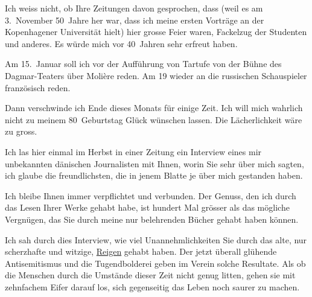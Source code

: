\pstart
           Ich weiss nicht, ob Ihre Zeitungen davon gesprochen, dass (weil es am
                  3. November 50 Jahre her war, dass ich meine ersten Vorträge an der
                  Kopenhagener Universität hielt) hier grosse
               Feier waren, Fackelzug der Studenten {\pb}und anderes. Es würde mich vor
               40 Jahren sehr erfreut haben.\pend
           
\pstart
           Am 15. Januar soll ich vor der Aufführung von Tartufe von der Bühne des Dagmar-Teaters über Molière reden. Am
                  19 wieder an die russischen
               Schauspieler französisch reden.\pend
           
\pstart
           Dann verschwinde ich Ende dieses Monats für einige Zeit. Ich will mich wahrlich nicht
               zu meinem 80 Geburtstag Glück wünschen lassen. Die Lächerlichkeit wäre zu gross.\pend
           
\pstart
           Ich las hier einmal im Herbst in einer Zeitung ein Interview eines mir unbekannten { }dänischen Journalisten mit
               Ihnen, worin Sie sehr \label{K_L02373-2v}\label{K_L02373-2} über
               mich sagten, ich glaube die freundlichsten, die in jenem Blatte je über mich
               gestanden haben.\pend
           
\pstart
           Ich bleibe Ihnen immer verpflichtet und {\pb}verbunden. Der Genuss, den ich
               durch das Lesen Ihrer Werke gehabt habe, ist hundert Mal grösser als das mögliche
               Vergnügen, das Sie durch meine nur belehrenden Bücher gehabt haben können.\pend
           
\pstart
           Ich sah durch dies Interview,
               wie viel Unannehmlichkeiten Sie durch das alte, nur scherzhafte und witzige, \uline{Reigen} gehabt haben. Der jetzt überall glühende Antisemitismus und die Tugendbolderei
                  \introOben{}geben\introOben{} im Verein 
               solche Resultate. Als ob die Menschen durch die Umstände dieser Zeit nicht genug
               litten, gehen sie mit zehnfachem Eifer darauf los, sich gegenseitig das Leben noch
               saurer zu machen.\pend
           
